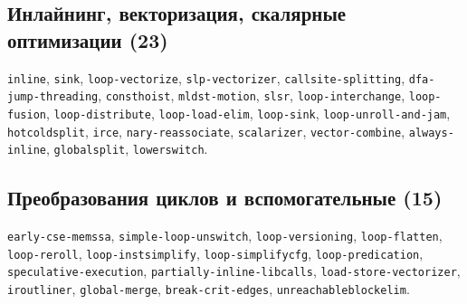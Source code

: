 \subsection*{Инлайнинг, векторизация, скалярные оптимизации (23)}

\begin{flushleft}
\texttt{inline}, \texttt{sink}, \texttt{loop-vectorize}, \texttt{slp-vectorizer}, \texttt{callsite-splitting}, \texttt{dfa-jump-threading}, \texttt{consthoist}, \texttt{mldst-motion}, \texttt{slsr}, \texttt{loop-interchange}, \texttt{loop-fusion}, \texttt{loop-distribute}, \texttt{loop-load-elim}, \texttt{loop-sink}, \texttt{loop-unroll-and-jam}, \texttt{hotcoldsplit}, \texttt{irce}, \texttt{nary-reassociate}, \texttt{scalarizer}, \texttt{vector-combine}, \texttt{always-inline}, \texttt{globalsplit}, \texttt{lowerswitch}.
\end{flushleft}

\subsection*{Преобразования циклов и вспомогательные (15)}

\begin{flushleft}
\texttt{early-cse-memssa}, \texttt{simple-loop-unswitch}, \texttt{loop-versioning}, \texttt{loop-flatten}, \texttt{loop-reroll}, \texttt{loop-instsimplify}, \texttt{loop-simplifycfg}, \texttt{loop-predication}, \texttt{speculative-execution}, \texttt{partially-inline-libcalls}, \texttt{load-store-vectorizer}, \texttt{iroutliner}, \texttt{global-merge}, \texttt{break-crit-edges}, \texttt{unreachableblockelim}.
\end{flushleft}

